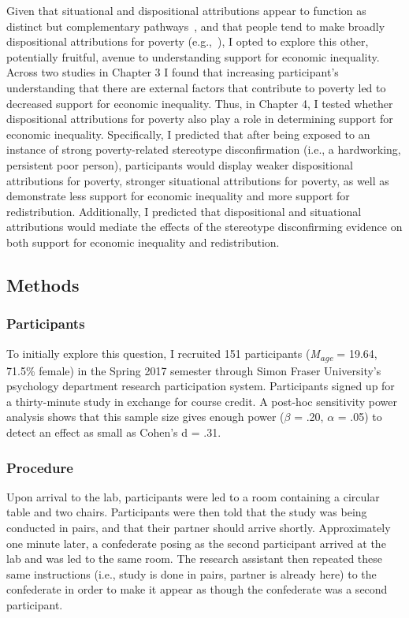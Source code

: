 \documentclass{sfuthesis}
\begin{document}
Given that situational and dispositional attributions appear to function as distinct but complementary pathways~\cite{miller81, solomon78}, and that people tend to make broadly dispositional attributions for poverty (e.g.,~\cite{cozzarelli01}), I opted to explore this other, potentially fruitful, avenue to understanding support for economic inequality. Across two studies in Chapter 3 I found that increasing participant’s understanding that there are external factors that contribute to poverty led to decreased support for economic inequality. Thus, in Chapter 4, I tested whether dispositional attributions for poverty also play a role in determining support for economic inequality. Specifically, I predicted that after being exposed to an instance of strong poverty-related stereotype disconfirmation (i.e., a hardworking, persistent poor person), participants would display weaker dispositional attributions for poverty, stronger situational attributions for poverty, as well as demonstrate less support for economic inequality and more support for redistribution. Additionally, I predicted that dispositional and situational attributions would mediate the effects of the stereotype disconfirming evidence on both support for economic inequality and redistribution.

\subsection{Methods}
\subsubsection{Participants}

To initially explore this question, I recruited 151 participants (\textit{M\textsubscript{age}} = 19.64, 71.5\% female) in the Spring 2017 semester through Simon Fraser University’s psychology department research participation system. Participants signed up for a thirty-minute study in exchange for course credit. A post-hoc sensitivity power analysis shows that this sample size gives enough power ($\beta$ = .20, $\alpha$ = .05) to detect an effect as small as Cohen’s d = .31.

\subsubsection{Procedure}

Upon arrival to the lab, participants were led to a room containing a circular table and two chairs. Participants were then told that the study was being conducted in pairs, and that their partner should arrive shortly. Approximately one minute later, a confederate posing as the second participant arrived at the lab and was led to the same room. The research assistant then repeated these same instructions (i.e., study is done in pairs, partner is already here) to the confederate in order to make it appear as though the confederate was a second participant.
\end{document}
